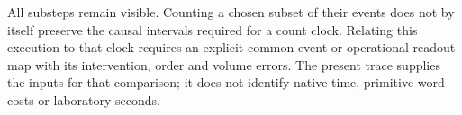 All substeps remain visible. Counting a chosen subset of their events does
not by itself preserve the causal intervals required for a count clock.
Relating this execution to that clock requires an explicit common event
or operational readout map with its intervention, order and volume errors.
The present trace supplies the inputs for that comparison; it does not
identify native time, primitive word costs or laboratory seconds.

